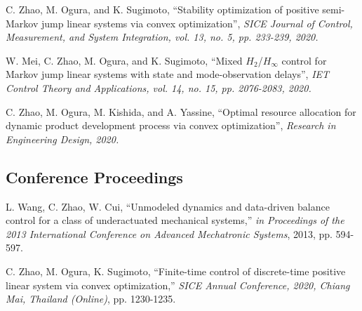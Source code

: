\documentclass[letterpaper]{article}
\begin{document}
\begin{enumerate}[label={[\arabic*]}, noitemsep]
\item C. Zhao, M. Ogura, and K. Sugimoto, \enquote{Stability optimization of positive semi-Markov jump linear systems via convex optimization}, {\it SICE Journal of Control, Measurement, and System Integration, vol. 13, no. 5, pp. 233-239, 2020.}\\

\item W. Mei, C. Zhao, M. Ogura, and K. Sugimoto, \enquote{Mixed $H_2$/$H_{\infty}$ control for Markov jump linear systems with state and mode-observation delays}, {\it IET Control Theory and Applications, vol. 14, no. 15, pp. 2076-2083, 2020.}\\

\item C. Zhao, M. Ogura, M. Kishida, and A. Yassine, \enquote{Optimal resource allocation for dynamic product development process via convex optimization}, {\it Research in Engineering Design, 2020.}  \\


\end{enumerate}

\subsection*{Conference Proceedings}

\begin{enumerate}[label={[\arabic*]}, noitemsep]
\item L. Wang, C. Zhao, W. Cui, \enquote{Unmodeled dynamics and data-driven balance control for a class of underactuated mechanical systems,} {\it in Proceedings of the 2013 International Conference on Advanced Mechatronic Systems}, 2013, pp. 594-597.\\

\item C. Zhao, M. Ogura, K. Sugimoto, \enquote{Finite-time control of  discrete-time positive linear system via convex optimization,}  {\it SICE Annual Conference, 2020, Chiang Mai, Thailand (Online)}, pp. 1230-1235. 
\end{enumerate}
\end{document}

